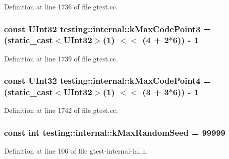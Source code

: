 Definition at line 1736 of file gtest.\+cc.

\subsubsection[{\texorpdfstring{k\+Max\+Code\+Point3}{kMaxCodePoint3}}]{\setlength{\rightskip}{0pt plus 5cm}const {\bf U\+Int32} testing\+::internal\+::k\+Max\+Code\+Point3 = (static\+\_\+cast$<${\bf U\+Int32}$>$(1) $<$$<$ (4 + 2$\ast$6)) -\/ 1}\hypertarget{namespacetesting_1_1internal_aa42bd507418e570402996e33582beed3}{}\label{namespacetesting_1_1internal_aa42bd507418e570402996e33582beed3}


Definition at line 1739 of file gtest.\+cc.

\subsubsection[{\texorpdfstring{k\+Max\+Code\+Point4}{kMaxCodePoint4}}]{\setlength{\rightskip}{0pt plus 5cm}const {\bf U\+Int32} testing\+::internal\+::k\+Max\+Code\+Point4 = (static\+\_\+cast$<${\bf U\+Int32}$>$(1) $<$$<$ (3 + 3$\ast$6)) -\/ 1}\hypertarget{namespacetesting_1_1internal_acd87c60be9b5fedb2d017503d8834474}{}\label{namespacetesting_1_1internal_acd87c60be9b5fedb2d017503d8834474}


Definition at line 1742 of file gtest.\+cc.

\subsubsection[{\texorpdfstring{k\+Max\+Random\+Seed}{kMaxRandomSeed}}]{\setlength{\rightskip}{0pt plus 5cm}const int testing\+::internal\+::k\+Max\+Random\+Seed = 99999}\hypertarget{namespacetesting_1_1internal_a41bd421ace53d23dbe85d9618c3afaee}{}\label{namespacetesting_1_1internal_a41bd421ace53d23dbe85d9618c3afaee}


Definition at line 106 of file gtest-\/internal-\/inl.\+h.

